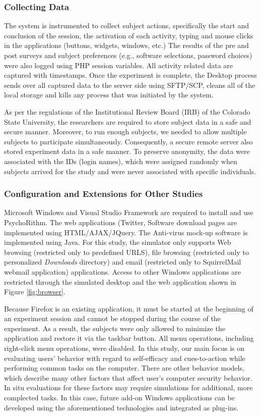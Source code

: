 \subsubsection{Collecting Data}
The system is instrumented to collect subject actions, specifically the start and conclusion of the session, the activation of each activity, typing and mouse clicks in the applications (buttons, widgets, windows, etc.) The results of the pre and post surveys and subject preferences (e.g., software selections, password choices) were also logged using PHP session variables. All activity related data are captured with timestamps. Once the experiment is complete, the Desktop
process sends over all captured data to the server side using SFTP/SCP, cleans all of the local storage and kills any process that was initiated by the system.

As per the regulations of the Institutional Review Board (IRB) of the Colorado State University, the researchers are required to store subject data in a safe and secure manner. Moreover, to run enough subjects, we needed to allow multiple subjects to participate simultaneously. Consequently, a secure remote server also stored experiment data in a safe manner. To preserve anonymity, the data were associated with the IDs (login names), which were assigned randomly when subjects arrived for the study and were never associated with specific individuals.

\subsubsection{Configuration and Extensions for Other Studies}
Microsoft Windows and Visual Studio Framework are required to install and use PsychoRithm. The web applications (Twitter, Software download pages are implemented using HTML/AJAX/JQuery. The Anti-virus mock-up software is implemented using Java. For this study, the simulator only supports Web browsing (restricted only to predefined URLS), file browsing (restricted only to personalized \textit{Downloads} directory) and email (restricted only to SquirrelMail webmail application) applications. Access to other Windows applications are restricted through the simulated desktop and the web application shown in Figure \ref{fig:browser}. 

Because Firefox is an existing application, it must be started at the beginning of an experiment session and cannot be stopped during the course of the experiment. As a result, the subjects were only allowed to minimize the application and restore it via the taskbar button. All menu operations, including right-click menu operations, were disabled. In this study, our main focus is on evaluating users' behavior with regard to self-efficacy and cues-to-action while performing common tasks on the computer. There are other behavior models, which describe many other factors that affect user's computer security behavior. In situ evaluations for these factors may require simulations for additional, more complected tasks. In this case, future add-on Windows applications can be developed using the aforementioned technologies and integrated as plug-ins.


